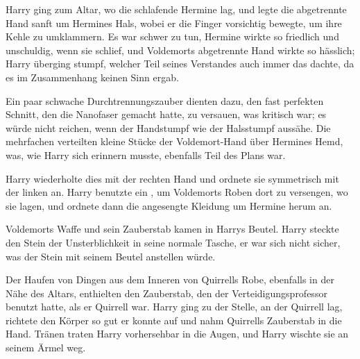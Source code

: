 Harry ging zum Altar, wo die schlafende Hermine lag, und legte die abgetrennte Hand sanft um Hermines Hals, wobei er die Finger vorsichtig bewegte, um ihre Kehle zu umklammern.
Es war schwer zu tun, Hermine wirkte so friedlich und unschuldig, wenn sie schlief, und Voldemorts abgetrennte Hand wirkte so hässlich; Harry überging stumpf, welcher Teil seines Verstandes auch immer das dachte, da es im Zusammenhang keinen Sinn ergab.

Ein paar schwache Durchtrennungszauber dienten dazu, den fast perfekten Schnitt, den die Nanofaser gemacht hatte, zu versauen, was kritisch war; es würde nicht reichen, wenn der Handstumpf wie der Halsstumpf aussähe. Die mehrfachen  verteilten kleine Stücke der Voldemort-Hand über Hermines Hemd, was, wie Harry sich erinnern musste, ebenfalls Teil des Plans war.

Harry wiederholte dies mit der rechten Hand und ordnete sie symmetrisch mit der linken an.
Harry benutzte ein , um Voldemorts Roben dort zu versengen, wo sie lagen, und ordnete dann die angesengte Kleidung um Hermine herum an.

Voldemorts Waffe und sein Zauberstab kamen in Harrys Beutel. Harry steckte den Stein der Unsterblichkeit in seine normale Tasche, er war sich nicht sicher, was der Stein mit seinem Beutel anstellen würde.

Der Haufen von Dingen aus dem Inneren von Quirrells Robe, ebenfalls in der Nähe des Altars, enthielten den Zauberstab, den der Verteidigungsprofessor benutzt hatte, als er Quirrell war. Harry ging zu der Stelle, an der Quirrell lag, richtete den Körper so gut er konnte auf und nahm Quirrells Zauberstab in die Hand. Tränen traten Harry vorhersehbar in die Augen, und Harry wischte sie an seinem Ärmel weg.

